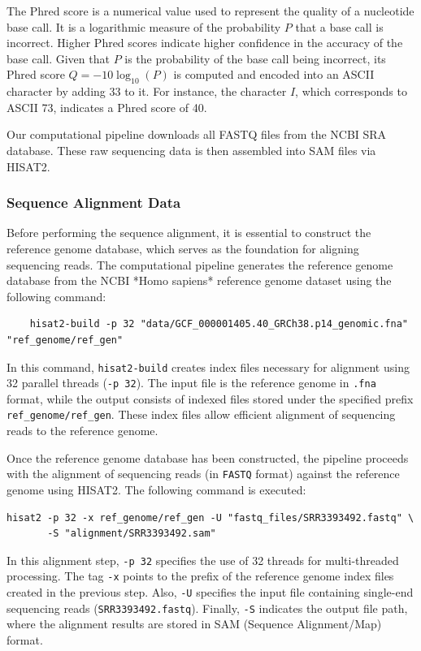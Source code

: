 The Phred score is a numerical value used to represent the quality of a nucleotide base call. It is a logarithmic measure of the probability \(P\) that a base call is incorrect. Higher Phred scores indicate higher confidence in the accuracy of the base call. Given that \(P\) is the probability of the base call being incorrect, its Phred score \(Q = -10 \log_{10}(P)\) is computed and encoded into an ASCII character by adding \(33\) to it. For instance, the character \(I\), which corresponds to ASCII 73, indicates a Phred score of 40.

Our computational pipeline downloads all FASTQ files from the NCBI SRA database. These raw sequencing data is then assembled into SAM files via HISAT2.

\subsubsection{Sequence Alignment Data}  
Before performing the sequence alignment, it is essential to construct the reference genome database, which serves as the foundation for aligning sequencing reads. The computational pipeline generates the reference genome database from the NCBI *Homo sapiens* reference genome dataset using the following command:

\begin{verbatim}
    hisat2-build -p 32 "data/GCF_000001405.40_GRCh38.p14_genomic.fna" "ref_genome/ref_gen"
\end{verbatim}

In this command, \texttt{hisat2-build} creates index files necessary for alignment using 32 parallel threads (\texttt{-p 32}). The input file is the reference genome in \texttt{.fna} format, while the output consists of indexed files stored under the specified prefix \texttt{ref\_genome/ref\_gen}. These index files allow efficient alignment of sequencing reads to the reference genome.

Once the reference genome database has been constructed, the pipeline proceeds with the alignment of sequencing reads (in \texttt{FASTQ} format) against the reference genome using HISAT2. The following command is executed:

\begin{verbatim}
hisat2 -p 32 -x ref_genome/ref_gen -U "fastq_files/SRR3393492.fastq" \
       -S "alignment/SRR3393492.sam"
\end{verbatim}
In this alignment step, \texttt{-p 32} specifies the use of 32 threads for multi-threaded processing. The tag \texttt{-x} points to the prefix of the reference genome index files created in the previous step. Also, \texttt{-U} specifies the input file containing single-end sequencing reads (\texttt{SRR3393492.fastq}). Finally, \texttt{-S} indicates the output file path, where the alignment results are stored in SAM (Sequence Alignment/Map) format.

